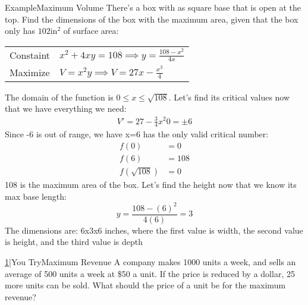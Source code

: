 \documentclass{MathNotes}
\newenvironment{example}[1]{\begin{BlueBox}{Example}{#1}}{\end{BlueBox}}
\newenvironment{practice}[2]{\begin{PurpleBox}{\texorpdfstring{#1}\Big|You Try}{#2}}{\end{PurpleBox}}
\begin{document}
\begin{example}{Maximum Volume}
	There's a box with as square base that is open at the top. Find the dimensions of the box with the maximum area, given that the box only has $102\text{in}^2$ of surface area:\newline
	\begin{center}
		\begin{tabular}{ll}
			Constaint & $x^2+4xy=108\implies y=\frac{108-x^2}{4x}$ \\
			Maximize  & $V=x^2y\implies V=27x-\frac{x^3}{4}$
		\end{tabular}
	\end{center}
	The domain of the function is $0\leq x\leq\sqrt{108}$. Let's find its critical
	values now that we have everything we need:
	\begin{align*}
		V'=27-\frac{3}{4}x^2
		0=\pm 6
	\end{align*}
	Since -6 is out of range, we have x=6 has the only valid critical number:
	\begin{align*}
		f(0)          & =0   \\
		f(6)          & =108 \\
		f(\sqrt{108}) & =0
	\end{align*}
	108 is the maximum area of the box. Let's find the height now that we know its
	max base length: $$y=\frac{108-(6)^2}{4(6)}=3$$
	The dimensions are: 6x3x6 inches, where the first value is width, the second value is height, and the third value is depth
\end{example}
\begin{practice}{\hyperref[ans:3.5-1]{1}}{Maximum Revenue}\label{prac:3.5-1}
	A company makes 1000 units a week, and sells an average of 500 units a week at \$50 a unit. If the price is reduced by a dollar, 25 more units can be sold. What should the price of a unit be for the maximum revenue?
\end{practice}

\end{document}
